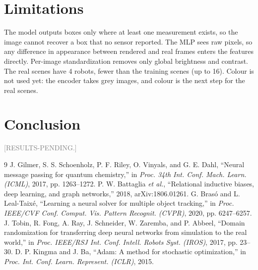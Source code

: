 \documentclass[conference]{IEEEtran}
\begin{document}
\section{Limitations}

The model outputs boxes only where at least one measurement exists, so the image cannot recover a box that no
sensor reported. The MLP sees raw pixels, so any difference in appearance between rendered and real frames enters
the features directly. Per-image standardization removes only global brightness and contrast. The real scenes have
4 robots, fewer than the training scenes (up to 16). Colour is not used yet: the encoder takes grey images, and
colour is the next step for the real scenes.

\section{Conclusion}

\textcolor{gray}{[RESULTS-PENDING.]}

\begin{thebibliography}{9}
 J. Gilmer, S. S. Schoenholz, P. F. Riley, O. Vinyals, and G. E. Dahl, ``Neural message passing
for quantum chemistry,'' in \emph{Proc. 34th Int. Conf. Mach. Learn. (ICML)}, 2017, pp. 1263--1272.
 P. W. Battaglia \emph{et al.}, ``Relational inductive biases, deep learning, and graph
networks,'' 2018, arXiv:1806.01261.
 G. Brasó and L. Leal-Taixé, ``Learning a neural solver for multiple object tracking,'' in
\emph{Proc. IEEE/CVF Conf. Comput. Vis. Pattern Recognit. (CVPR)}, 2020, pp. 6247--6257.
 J. Tobin, R. Fong, A. Ray, J. Schneider, W. Zaremba, and P. Abbeel, ``Domain randomization for
transferring deep neural networks from simulation to the real world,'' in \emph{Proc. IEEE/RSJ Int. Conf. Intell.
Robots Syst. (IROS)}, 2017, pp. 23--30.
 D. P. Kingma and J. Ba, ``Adam: A method for stochastic optimization,'' in \emph{Proc. Int.
Conf. Learn. Represent. (ICLR)}, 2015.
\end{thebibliography}
\end{document}

